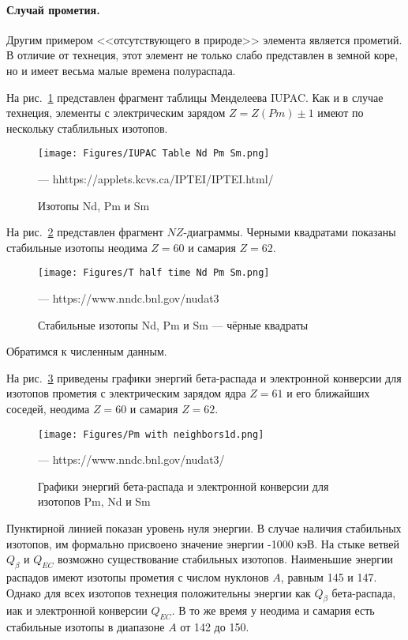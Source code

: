 \documentclass[a5paper,openany]{book}
\begin{document}
\paragraph{Случай прометия.}

Другим примером <<отсутствующего в природе>> элемента является прометий. 
В отличие от технеция, этот элемент не только слабо представлен в земной коре, но и имеет весьма малые времена полураспада.

На рис.~\ref{f:IUPAC Table  Nd Pm Sm} представлен фрагмент таблицы Менделеева IUPAC.
Как и в случае технеция, элементы с электрическим зарядом $Z=Z(Pm) \pm 1$ имеют по нескольку стаблильных изотопов.

\begin{figure}[ht] 
	\centering\small
	\unitlength=1mm
	\texttt{[image: Figures/IUPAC Table Nd Pm Sm.png]} 
	\caption{Изотопы Nd, Pm  и Sm} --- hhttps://applets.kcvs.ca/IPTEI/IPTEI.html/
	\label{f:IUPAC Table  Nd Pm Sm}
\end{figure}

На рис.~\ref{f:T half time MNd Pm Sm.png} представлен фрагмент $NZ$-диаграммы.
Черными квадратами показаны стабильные изотопы неодима  $Z=60$ и самария $Z=62$.

\begin{figure}[ht] 
	\centering\small
	\unitlength=1mm
	\texttt{[image: Figures/T half time Nd Pm Sm.png]} 
	\caption{Стабильные изотопы Nd, Pm  и Sm --- чёрные квадраты} --- https://www.nndc.bnl.gov/nudat3
	\label{f:T half time MNd Pm Sm.png}
\end{figure}
Обратимся к численным данным.

На рис.~\ref{f:Pm with neighbors} приведены графики энергий бета-распада и электронной конверсии для изотопов прометия с электрическим зарядом ядра $Z=61$ и его ближайших соседей, неодима  $Z=60$ и самария $Z=62$.

\begin{figure}[ht] 
	\centering\small
	\unitlength=1mm
	\texttt{[image: Figures/Pm with neighbors1d.png]} 
	\caption{Графики энергий бета-распада и электронной конверсии для изотопов Pm, Nd и Sm} --- https://www.nndc.bnl.gov/nudat3/
	\label{f:Pm with neighbors}
\end{figure}

Пунктирной линией показан уровень нуля энергии. В случае наличия стабильных изотопов, им формально присвоено значение энергии -1000 кэВ. 
На стыке ветвей $Q_{\beta}$  и $Q_{EC}$ возможно существование стабильных изотопов.
Наименьшие энергии распадов имеют изотопы прометия с числом нуклонов $A$, равным 145 и 147.
Однако для всех изотопов технеция положительны энергии как $Q_{\beta}$ бета-распада, иак и электронной конверсии $Q_{EC}$. 
В то же время у неодима и самария есть стабильные изотопы в диапазоне $A$ от 142 до 150. 
\end{document}
